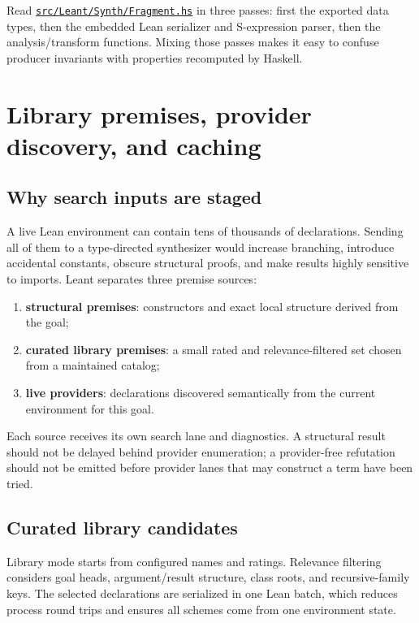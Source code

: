 \documentclass[10pt,letterpaper,oneside]{report}
\def\LeantBase{https://github.com/VladimirReshetnikov/Leant/blob/ada69d884480b93e74ee4b3daf77be38702ee07d/}
\newcommand{\lpath}[1]{\href{\LeantBase#1}{\nolinkurl{#1}}}
\newcommand{\term}[1]{\textbf{#1}}
\begin{document}
\begin{sourcebox}
Read \lpath{src/Leant/Synth/Fragment.hs} in three passes: first the exported data types, then the embedded Lean serializer and S-expression parser, then the analysis/transform functions. Mixing those passes makes it easy to confuse producer invariants with properties recomputed by Haskell.
\end{sourcebox}

\chapter{Library premises, provider discovery, and caching}\label{ch:providers}

\section{Why search inputs are staged}

A live Lean environment can contain tens of thousands of declarations. Sending all of them to a type-directed synthesizer would increase branching, introduce accidental constants, obscure structural proofs, and make results highly sensitive to imports. Leant separates three premise sources:

\begin{enumerate}
  \item \term{structural premises}: constructors and exact local structure derived from the goal;
  \item \term{curated library premises}: a small rated and relevance-filtered set chosen from a maintained catalog;
  \item \term{live providers}: declarations discovered semantically from the current environment for this goal.
\end{enumerate}

Each source receives its own search lane and diagnostics. A structural result should not be delayed behind provider enumeration; a provider-free refutation should not be emitted before provider lanes that may construct a term have been tried.

\section{Curated library candidates}

Library mode starts from configured names and ratings. Relevance filtering considers goal heads, argument/result structure, class roots, and recursive-family keys. The selected declarations are serialized in one Lean batch, which reduces process round trips and ensures all schemes come from one environment state.
\end{document}
